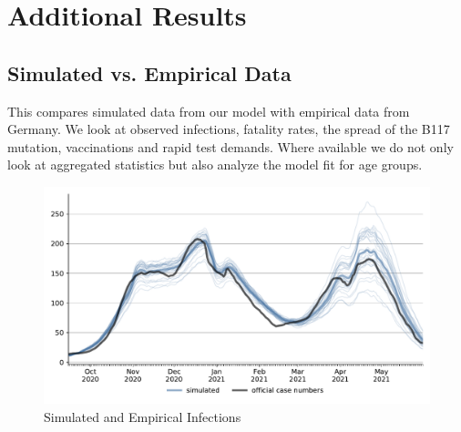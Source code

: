 \section{Additional Results}
\label{sec:additional_results}

\subsection{Simulated vs. Empirical Data}
\label{subsec:new_cases_fit}

This compares simulated data from our model with empirical data from Germany. We look at
observed infections, fatality rates, the spread of the B117 mutation, vaccinations and
rapid test demands. Where available we do not only look at aggregated statistics but also
analyze the model fit for age groups.


\begin{figure}[ht]
  \centering
  \includegraphics[width=\textwidth]{../figures/results/figures/scenario_comparisons/combined_fit/full_new_known_case_with_single_runs}
  \caption{Simulated and Empirical Infections}
  \label{fig:aggregated_fit2}
\end{figure}


